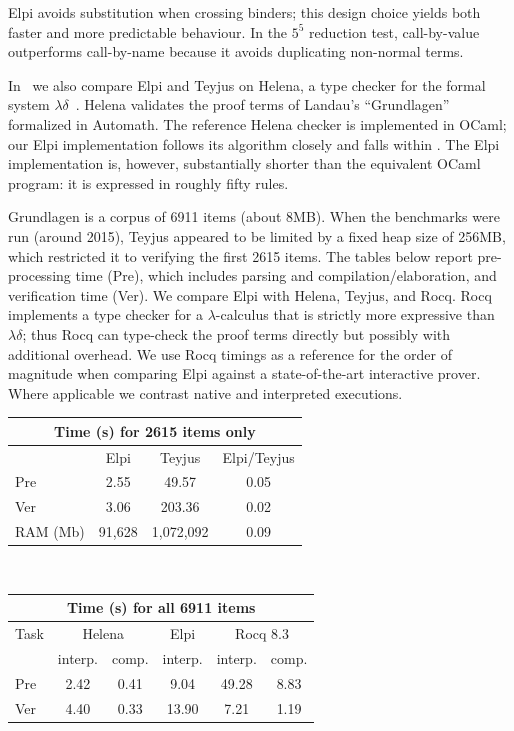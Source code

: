 \documentclass{these-ISSS}
\begin{document}
Elpi avoids substitution when crossing binders; this design choice yields
both faster and more predictable behaviour. In the $5^5$ reduction test,
call-by-value outperforms call-by-name because it avoids duplicating
non-normal terms.

In~\cite{dunchev15lpar} we also compare Elpi and Teyjus on Helena, a type
checker for the formal system $\lambda\delta$~\cite{lambdadeltaJ1,lambdadeltaJ3a}.
Helena validates the proof terms of Landau's ``Grundlagen''~\cite{Jut79}
formalized in Automath. The reference Helena checker is implemented in
OCaml; our Elpi implementation follows its algorithm closely and falls
within \thefragment{}. The Elpi implementation is, however, substantially
shorter than the equivalent OCaml program: it is expressed in roughly fifty
rules.

Grundlagen is a corpus of 6911 items (about 8MB). When the benchmarks were
run (around 2015), Teyjus appeared to be limited by a fixed heap size of
256MB, which restricted it to verifying the first 2615 items. The tables
below report pre-processing time (Pre), which includes parsing and
compilation/elaboration, and verification time (Ver). We compare Elpi with
Helena, Teyjus, and Rocq. Rocq implements a type checker for a
$\lambda$-calculus that is strictly more expressive than $\lambda\delta$;
thus Rocq can type-check the proof terms directly but possibly with additional
overhead. We use Rocq timings as a reference for the order of magnitude when
comparing Elpi against a state-of-the-art interactive prover. Where
applicable we contrast native and interpreted executions.
\begin{center}
  \scriptsize 
\begin{tabular}{|l|c|c|c|}
\hline
\multicolumn{4}{|c|}{Time (s) for 2615 items only}\\
\hline
 & Elpi          & Teyjus  & Elpi/Teyjus        \\
\hline
Pre      & 2.55 & 49.57 & 0.05 \\
\hline
Ver      & 3.06 & 203.36 & 0.02 \\ \hline
RAM (Mb) & 91,628 & 1,072,092 & 0.09 \\
\hline
\end{tabular}
~~
\begin{tabular}{|l|c|c|c|c|c|}
\hline
\multicolumn{6}{|c|}{Time (s) for all 6911 items}\\
\hline
Task                   &\multicolumn{2}{|c|}{Helena}         & Elpi          & \multicolumn{2}{|c|}{Rocq 8.3}            \\
                 &interp. & comp.& interp. &interp. & comp.\\ \hline
Pre & 2.42 & 0.41 & 9.04 & 49.28 & 8.83 \\
\hline
Ver & 4.40 & 0.33 & 13.90 & 7.21 & 1.19\\ %
\hline
\end{tabular}
\end{center}
\end{document}
